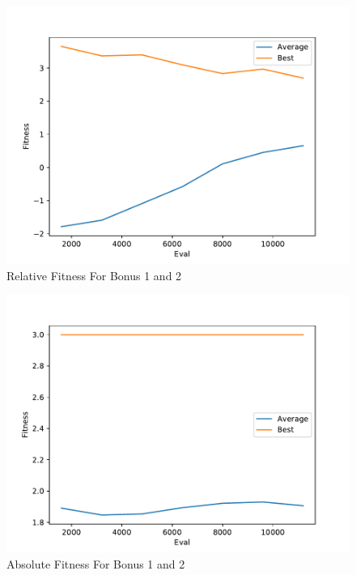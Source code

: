 \documentclass[times]{article}
\begin{document}
	\begin{figure}
		\caption{Relative Fitness For Bonus 1 and 2}
		\label{fig:rel_bonus}
		\includegraphics[width=\textwidth]{../graph/graphs/7.pdf}
	\end{figure}

	\begin{figure}
		\caption{Absolute Fitness For Bonus 1 and 2}
		\label{fig:abs_bonus}
		\includegraphics[width=\textwidth]{../graph/absolute/7.pdf}
	\end{figure}
\end{document}
